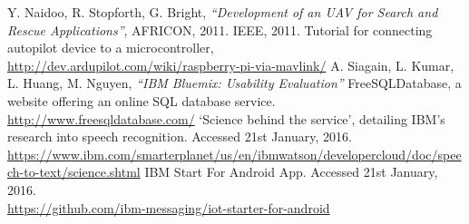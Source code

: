 \documentclass{article}
\begin{document}
\begin{thebibliography}{20}
    Y. Naidoo, R. Stopforth, G. Bright, \textit{``Development of an UAV for Search and Rescue Applications''}, AFRICON, 2011. IEEE, 2011.
    Tutorial for connecting autopilot device to a microcontroller, \\
    \url{http://dev.ardupilot.com/wiki/raspberry-pi-via-mavlink/}
    A. Siagain, L. Kumar, L. Huang, M. Nguyen, \textit{``IBM Bluemix: Usability Evaluation''}
    FreeSQLDatabase, a website offering an online SQL database service. \\
    \url{http://www.freesqldatabase.com/}
    `Science behind the service', detailing IBM's research into speech recognition. Accessed 21st January, 2016. \\
    \url{https://www.ibm.com/smarterplanet/us/en/ibmwatson/developercloud/doc/speech-to-text/science.shtml}
    IBM Start For Android App. Accessed 21st January, 2016. \\
    \url{https://github.com/ibm-messaging/iot-starter-for-android}

\end{thebibliography}
\end{document}
